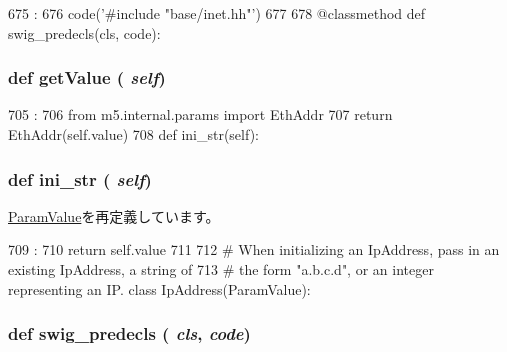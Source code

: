 \begin{DoxyCode}
675                                :
676         code('#include "base/inet.hh"')
677 
678     @classmethod
    def swig_predecls(cls, code):
\end{DoxyCode}
\hypertarget{classm5_1_1params_1_1EthernetAddr_acc340fbd4335fa34f9d57fb454b28ed0}{
\subsubsection[{getValue}]{\setlength{\rightskip}{0pt plus 5cm}def getValue ( {\em self})}}
\label{classm5_1_1params_1_1EthernetAddr_acc340fbd4335fa34f9d57fb454b28ed0}



\begin{DoxyCode}
705                       :
706         from m5.internal.params import EthAddr
707         return EthAddr(self.value)
708 
    def ini_str(self):
\end{DoxyCode}
\hypertarget{classm5_1_1params_1_1EthernetAddr_a33ebe6cd32bcbd15465fc28b9d94bf82}{
\subsubsection[{ini\_\-str}]{\setlength{\rightskip}{0pt plus 5cm}def ini\_\-str ( {\em self})}}
\label{classm5_1_1params_1_1EthernetAddr_a33ebe6cd32bcbd15465fc28b9d94bf82}


\hyperlink{classm5_1_1params_1_1ParamValue_a33ebe6cd32bcbd15465fc28b9d94bf82}{ParamValue}を再定義しています。


\begin{DoxyCode}
709                      :
710         return self.value
711 
712 # When initializing an IpAddress, pass in an existing IpAddress, a string of
713 # the form "a.b.c.d", or an integer representing an IP.
class IpAddress(ParamValue):
\end{DoxyCode}
\hypertarget{classm5_1_1params_1_1EthernetAddr_ab3dbcf5716623eac67a8ccc074fa7e13}{
\subsubsection[{swig\_\-predecls}]{\setlength{\rightskip}{0pt plus 5cm}def swig\_\-predecls ( {\em cls}, \/   {\em code})}}
\label{classm5_1_1params_1_1EthernetAddr_ab3dbcf5716623eac67a8ccc074fa7e13}


